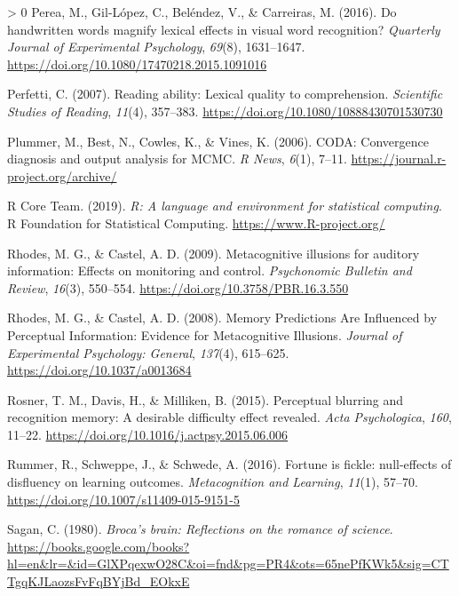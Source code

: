 \documentclass[
  english,
  jou]{apa7}
\newlength{\cslhangindent}
\newenvironment{CSLReferences}[3] %
 {%
  \setlength{\parindent}{0pt}
  \ifodd #1 \everypar{\setlength{\hangindent}{\cslhangindent}}\ignorespaces\fi
  \ifnum #2 > 0
  \setlength{\parskip}{#2\baselineskip}
  \fi
 }%
 {}
\begin{document}
\begin{CSLReferences}{1}{0}
\leavevmode\hypertarget{ref-Perea2016}{}%
Perea, M., Gil-López, C., Beléndez, V., \& Carreiras, M. (2016). {Do handwritten words magnify lexical effects in visual word recognition?} \emph{Quarterly Journal of Experimental Psychology}, \emph{69}(8), 1631--1647. \url{https://doi.org/10.1080/17470218.2015.1091016}

\leavevmode\hypertarget{ref-Perfetti2007}{}%
Perfetti, C. (2007). {Reading ability: Lexical quality to comprehension}. \emph{Scientific Studies of Reading}, \emph{11}(4), 357--383. \url{https://doi.org/10.1080/10888430701530730}

\leavevmode\hypertarget{ref-R-coda}{}%
Plummer, M., Best, N., Cowles, K., \& Vines, K. (2006). CODA: Convergence diagnosis and output analysis for MCMC. \emph{R News}, \emph{6}(1), 7--11. \url{https://journal.r-project.org/archive/}

\leavevmode\hypertarget{ref-R-base}{}%
R Core Team. (2019). \emph{R: A language and environment for statistical computing}. R Foundation for Statistical Computing. \url{https://www.R-project.org/}

\leavevmode\hypertarget{ref-Rhodes2009}{}%
Rhodes, M. G., \& Castel, A. D. (2009). {Metacognitive illusions for auditory information: Effects on monitoring and control}. \emph{Psychonomic Bulletin and Review}, \emph{16}(3), 550--554. \url{https://doi.org/10.3758/PBR.16.3.550}

\leavevmode\hypertarget{ref-Rhodes2008}{}%
Rhodes, M. G., \& Castel, A. D. (2008). {Memory Predictions Are Influenced by Perceptual Information: Evidence for Metacognitive Illusions}. \emph{Journal of Experimental Psychology: General}, \emph{137}(4), 615--625. \url{https://doi.org/10.1037/a0013684}

\leavevmode\hypertarget{ref-Rosner2015}{}%
Rosner, T. M., Davis, H., \& Milliken, B. (2015). {Perceptual blurring and recognition memory: A desirable difficulty effect revealed}. \emph{Acta Psychologica}, \emph{160}, 11--22. \url{https://doi.org/10.1016/j.actpsy.2015.06.006}

\leavevmode\hypertarget{ref-Rummer2016}{}%
Rummer, R., Schweppe, J., \& Schwede, A. (2016). {Fortune is fickle: null-effects of disfluency on learning outcomes}. \emph{Metacognition and Learning}, \emph{11}(1), 57--70. \url{https://doi.org/10.1007/s11409-015-9151-5}

\leavevmode\hypertarget{ref-Sagan1980}{}%
Sagan, C. (1980). \emph{{Broca's brain: Reflections on the romance of science}}. \url{https://books.google.com/books?hl=en\&lr=\&id=GlXPqexwO28C\&oi=fnd\&pg=PR4\&ots=65nePfKWk5\&sig=CTTgqKJLaozsFvFqBYjBd_EOkxE}


\end{CSLReferences}
\end{document}
